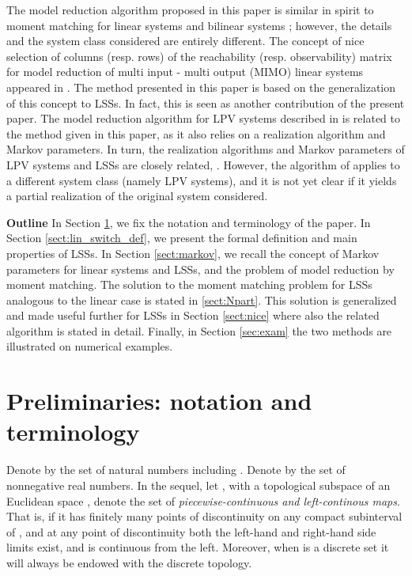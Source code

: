 \documentclass[journal]{IEEEtran}
\begin{document}
The model reduction algorithm proposed in this paper is similar in spirit to moment matching for linear systems \cite{antoulas,gugercin} and bilinear systems \cite{BilinearMomentMatching2,BilinearMomentMatching3,BilinearMomentMatching5}; however, the details and the system class considered are entirely different. The concept of nice selection of columns (resp. rows) of the reachability (resp. observability) matrix for model reduction of multi input - multi output (MIMO) linear systems appeared in \cite{gugercin}. The method presented in this paper is based on the generalization of this concept to LSSs. In fact, this is seen as another contribution of the present paper. The model reduction algorithm for LPV systems described in \cite{toth2012} is related to the method given in this paper, as it also relies on a realization algorithm and Markov parameters. In turn, the realization algorithms and Markov parameters of LPV systems and LSSs are closely related, \cite{PM12}. However, the algorithm of \cite{toth2012} applies to a different system class (namely LPV systems), and it is not yet clear if it yields a partial realization of the original system considered.

\textbf{Outline}
In Section \ref{sect:prelim}, we fix the notation and terminology of the paper. In Section \ref{sect:lin_switch_def}, we present the formal definition and main properties of LSSs. In Section \ref{sect:markov}, we recall the concept of Markov parameters for linear systems and LSSs, and the problem of model reduction by moment matching. The solution to the moment matching problem for LSSs analogous to the linear case is stated in \ref{sect:Npart}. This solution is generalized and made useful further for LSSs in Section \ref{sect:nice} where also the related algorithm is stated in detail. Finally, in Section \ref{sec:exam} the two methods are illustrated on numerical examples.






\section{Preliminaries: notation and terminology}
\label{sect:prelim}

Denote by  the set of natural numbers including . Denote by  the set  of nonnegative real numbers. In the sequel, let , with  a topological subspace of an Euclidean space , denote the set of \emph{piecewise-continuous and left-continous maps}. That is,  if it has finitely many points of discontinuity on any compact subinterval of , and at any point of discontinuity both the left-hand and right-hand side limits exist, and  is continuous from the left. Moreover, when  is a discrete set it will always be endowed with the discrete topology.
\end{document}
